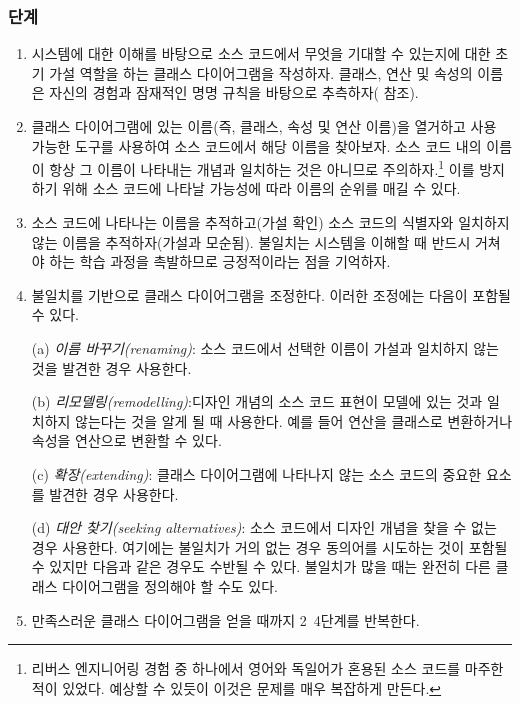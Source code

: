 \documentclass[a4paper,10pt,twoside]{book}
\begin{document}
\subsubsection*{단계}
\begin{enumerate}
  \item 시스템에 대한 이해를 바탕으로 소스 코드에서 무엇을 기대할 수 있는지에 대한 초기 가설 역할을 하는 클래스 다이어그램을 작성하자. 클래스, 연산 및 속성의 이름은 자신의 경험과 잠재적인 명명 규칙을 바탕으로 추측하자( 참조).

  \item 클래스 다이어그램에 있는 이름(즉, 클래스, 속성 및 연산 이름)을 열거하고 사용 가능한 도구를 사용하여 소스 코드에서 해당 이름을 찾아보자. 소스 코드 내의 이름이 항상 그 이름이 나타내는 개념과 일치하는 것은 아니므로 주의하자.\footnote{리버스 엔지니어링 경험 중 하나에서 영어와 독일어가 혼용된 소스 코드를 마주한 적이 있었다. 예상할 수 있듯이 이것은 문제를 매우 복잡하게 만든다.} 이를 방지하기 위해 소스 코드에 나타날 가능성에 따라 이름의 순위를 매길 수 있다.

  \item 소스 코드에 나타나는 이름을 추적하고(가설 확인) 소스 코드의 식별자와 일치하지 않는 이름을 추적하자(가설과 모순됨). 불일치는 시스템을 이해할 때 반드시 거쳐야 하는 학습 과정을 촉발하므로 긍정적이라는 점을 기억하자.

  \item 불일치를 기반으로 클래스 다이어그램을 조정한다. 이러한 조정에는 다음이 포함될 수 있다.

(a) \emph{이름 바꾸기(renaming)}: 소스 코드에서 선택한 이름이 가설과 일치하지 않는 것을 발견한 경우 사용한다.

(b) \emph{리모델링(remodelling)}:디자인 개념의 소스 코드 표현이 모델에 있는 것과 일치하지 않는다는 것을 알게 될 때 사용한다. 예를 들어 연산을 클래스로 변환하거나 속성을 연산으로 변환할 수 있다.

(c) \emph{확장(extending)}: 클래스 다이어그램에 나타나지 않는 소스 코드의 중요한 요소를 발견한 경우 사용한다.

(d) \emph{대안 찾기(seeking alternatives)}: 소스 코드에서 디자인 개념을 찾을 수 없는 경우 사용한다. 여기에는 불일치가 거의 없는 경우 동의어를 시도하는 것이 포함될 수 있지만 다음과 같은 경우도 수반될 수 있다. 불일치가 많을 때는 완전히 다른 클래스 다이어그램을 정의해야 할 수도 있다.

  \item 만족스러운 클래스 다이어그램을 얻을 때까지 2~4단계를 반복한다.

\end{enumerate}
\end{document}
